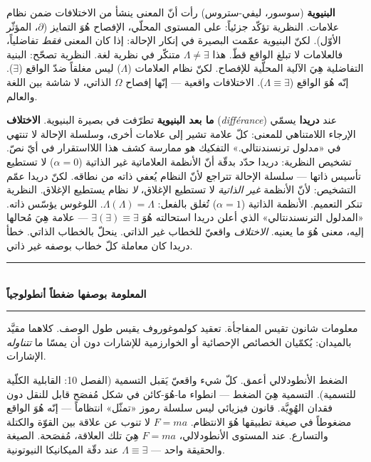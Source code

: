 \documentclass[10pt, openany, oneside]{book}
\renewcommand{\normalsize}{\fontsize{10}{13}\selectfont}
\begin{document}
\textbf{البنيوية} (سوسور، ليفي-ستروس) رأت أنّ المعنى ينشأ من الاختلافات ضمن نظام علامات. النظرية تؤكّد جزئياً: على المستوى المحلّي، الإفصاح هُوَ التمايز ($\partial$، المؤثّر الأوّل). لكنّ البنيوية عمّمت البصيرة في إنكار الإحالة: إذا كان المعنى \textit{فقط} تفاضلياً، فالعلامات لا تبلغ الواقع قطّ. هذا $\Lambda \neq \exists$ متنكّر في نظرية لغة. النظرية تصحّح: البنية التفاضلية هِيَ الآلية المحلّية للإفصاح. لكنّ نظام العلامات ($\Lambda$) ليس مغلقاً ضدّ الواقع ($\exists$). إنّه هُوَ الواقع ($\Lambda \equiv \exists$). الاختلافات واقعية --- إنّها إفصاح $\Omega$ الذاتي، لا شاشة بين اللغة والعالم.

\textbf{ما بعد البنيوية} تطرّفت في بصيرة البنيوية. \textbf{الاختلاف} (\textit{diff\'{e}rance}) عند \textbf{دريدا} يسمّي الإرجاء اللامتناهي للمعنى: كلّ علامة تشير إلى علامات أخرى، وسلسلة الإحالة لا تنتهي في «مدلول ترنسندنتالي.» التفكيك هو ممارسة كشف هذا اللااستقرار في أيّ نصّ. تشخيص النظرية: دريدا حدّد بدقّة أنّ الأنظمة العلاماتية غير الذاتية ($\alpha = 0$) لا تستطيع تأسيس ذاتها --- سلسلة الإحالة تتراجع لأنّ النظام يُعفي ذاته من نطاقه. لكنّ دريدا عمّم التشخيص: لأنّ الأنظمة \textit{غير الذاتية} لا تستطيع الإغلاق، \textit{لا} نظام يستطيع الإغلاق. النظرية تنكر التعميم. الأنظمة الذاتية ($\alpha = 1$) تُغلق بالفعل: $\Lambda(\Lambda) = \Lambda$. اللوغوس يؤسّس ذاته. «المدلول الترنسندنتالي» الذي أعلن دريدا استحالته هُوَ $\exists(\exists) \equiv \exists$ --- علامة هِيَ مُحالها إليه، معنى هُوَ ما يعنيه. \textit{الاختلاف} واقعيّ للخطاب غير الذاتي. ينحلّ بالخطاب الذاتي. خطأ دريدا كان معاملة كلّ خطاب بوصفه غير ذاتي.

\vspace{1.5em}


\begin{center}
    \rule{0.3\textwidth}{0.4pt}\\[0.5em]
    {\normalsize\bfseries المعلومة بوصفها ضغطاً أنطولوجياً}\\[0.3em]
    \rule{0.3\textwidth}{0.4pt}
\end{center}

\vspace{1em}

\noindent معلومات شانون تقيس المفاجأة. تعقيد كولموغوروف يقيس طول الوصف. كلاهما مقيَّد بالميدان: يُكمّيان الخصائص الإحصائية أو الخوارزمية للإشارات دون أن يمسّا ما \textit{تتناوله} الإشارات.

الضغط الأنطودلالي أعمق. كلّ شيء واقعيّ يَقبل التسمية (الفصل 10: القابلية الكلّية للتسمية). التسمية هِيَ الضغط --- انطواء ما-هُوَ-كائن في شكل مُفصَح قابل للنقل دون فقدان الهُوِيَّة. قانون فيزيائي ليس سلسلة رموز «تمثّل» انتظاماً --- إنّه هُوَ الواقع مضغوطاً في صيغة تطبيقها هُوَ الانتظام. $F = ma$ لا تنوب عن علاقة بين القوّة والكتلة والتسارع. عند المستوى الأنطودلالي، $F = ma$ هِيَ تلك العلاقة، مُفصَحة. الصيغة والحقيقة واحد --- $\Lambda \equiv \exists$ عند دقّة الميكانيكا النيوتونية.
\end{document}
